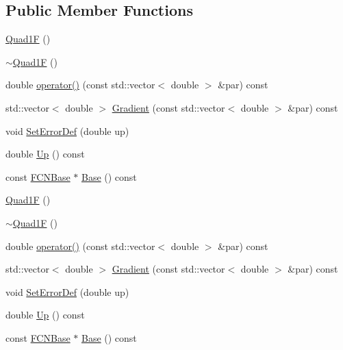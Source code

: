 \subsection*{Public Member Functions}
\begin{DoxyCompactItemize}
\item 
\mbox{\hyperlink{classROOT_1_1Minuit2_1_1Quad1F_afa0e15d8d1ead62a8b65fa402d0188fd}{Quad1F}} ()
\item 
\mbox{\hyperlink{classROOT_1_1Minuit2_1_1Quad1F_afed3b55617565f188fcfad81bdf4dfda}{$\sim$\+Quad1F}} ()
\item 
double \mbox{\hyperlink{classROOT_1_1Minuit2_1_1Quad1F_a879588547439114ea9ad1e749f1300c5}{operator()}} (const std\+::vector$<$ double $>$ \&par) const
\item 
std\+::vector$<$ double $>$ \mbox{\hyperlink{classROOT_1_1Minuit2_1_1Quad1F_a5862cb7b7c00f86bcff155d0033abd7f}{Gradient}} (const std\+::vector$<$ double $>$ \&par) const
\item 
void \mbox{\hyperlink{classROOT_1_1Minuit2_1_1Quad1F_a086ed11e56374ff0331676d7eac34395}{Set\+Error\+Def}} (double up)
\item 
double \mbox{\hyperlink{classROOT_1_1Minuit2_1_1Quad1F_a14469d6031751fa382120df6327da5ee}{Up}} () const
\item 
const \mbox{\hyperlink{classROOT_1_1Minuit2_1_1FCNBase}{F\+C\+N\+Base}} $\ast$ \mbox{\hyperlink{classROOT_1_1Minuit2_1_1Quad1F_ae1c01c02e015da9f172c3aa2d3089e85}{Base}} () const
\item 
\mbox{\hyperlink{classROOT_1_1Minuit2_1_1Quad1F_afa0e15d8d1ead62a8b65fa402d0188fd}{Quad1F}} ()
\item 
\mbox{\hyperlink{classROOT_1_1Minuit2_1_1Quad1F_afed3b55617565f188fcfad81bdf4dfda}{$\sim$\+Quad1F}} ()
\item 
double \mbox{\hyperlink{classROOT_1_1Minuit2_1_1Quad1F_a879588547439114ea9ad1e749f1300c5}{operator()}} (const std\+::vector$<$ double $>$ \&par) const
\item 
std\+::vector$<$ double $>$ \mbox{\hyperlink{classROOT_1_1Minuit2_1_1Quad1F_a5862cb7b7c00f86bcff155d0033abd7f}{Gradient}} (const std\+::vector$<$ double $>$ \&par) const
\item 
void \mbox{\hyperlink{classROOT_1_1Minuit2_1_1Quad1F_a086ed11e56374ff0331676d7eac34395}{Set\+Error\+Def}} (double up)
\item 
double \mbox{\hyperlink{classROOT_1_1Minuit2_1_1Quad1F_a14469d6031751fa382120df6327da5ee}{Up}} () const
\item 
const \mbox{\hyperlink{classROOT_1_1Minuit2_1_1FCNBase}{F\+C\+N\+Base}} $\ast$ \mbox{\hyperlink{classROOT_1_1Minuit2_1_1Quad1F_ae1c01c02e015da9f172c3aa2d3089e85}{Base}} () const
\end{DoxyCompactItemize}


